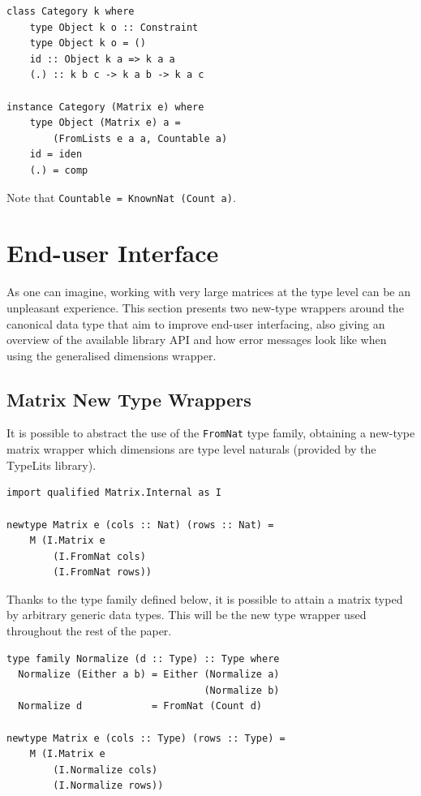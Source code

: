 \documentclass[sigplan,screen]{acmart}
\newcommand{\hs}{\texttt}
\def\doc{paper}
\begin{document}
\vspace{1mm}
\begin{verbatim}
class Category k where
    type Object k o :: Constraint
    type Object k o = ()
    id :: Object k a => k a a
    (.) :: k b c -> k a b -> k a c
    
instance Category (Matrix e) where
    type Object (Matrix e) a =
        (FromLists e a a, Countable a)
    id = iden
    (.) = comp
\end{verbatim}
\vspace{1mm}
Note that \hs{Countable = KnownNat (Count a)}.

\section{End-user Interface}\label{sec-manipulation}

As one can imagine, working with very large matrices at the type level can be an unpleasant experience. This section presents two new-type wrappers around the canonical data type that aim to improve end-user interfacing, also giving an overview of the available library API and how error messages look like when using the generalised dimensions wrapper.

\subsection{Matrix New Type Wrappers}\label{subsec-newtype-wrappers}

It is possible to abstract the use of the \hs{FromNat} type family, obtaining a new-type matrix wrapper which dimensions are type level naturals (provided by the TypeLits library). 

\vspace{1mm}
\begin{verbatim}
import qualified Matrix.Internal as I

newtype Matrix e (cols :: Nat) (rows :: Nat) = 
    M (I.Matrix e 
        (I.FromNat cols)
        (I.FromNat rows))
\end{verbatim}
\vspace{1mm}

Thanks to the type family defined below, it is possible to attain a matrix typed by arbitrary generic data types. This will be the new type wrapper used throughout the rest of the \doc.

\vspace{1mm}
\begin{verbatim}
type family Normalize (d :: Type) :: Type where
  Normalize (Either a b) = Either (Normalize a)
                                  (Normalize b)
  Normalize d            = FromNat (Count d)

newtype Matrix e (cols :: Type) (rows :: Type) = 
    M (I.Matrix e 
        (I.Normalize cols) 
        (I.Normalize rows)) 
\end{verbatim}
\vspace{1mm}
\end{document}
